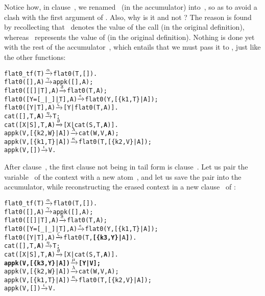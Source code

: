 Notice how, in clause~\clause{\lambda}, we renamed~ (in the
accumulator) into~, so as to avoid a clash with the first
argument of . Also, why is it  and
not ? The reason is found by recollecting that ~denotes the value of the call  (in the
original definition), whereas ~represents the value of
 (in the original definition). Nothing is done yet
with the rest of the accumulator~, which entails that we
must pass it to , just like the other functions:
\begin{alltt}
flat0\_tf(T)          \(\smashedrightarrow{\alpha}\) flat0(T,[]).
flat0(         [],A) \(\smashedrightarrow{\gamma}\) appk([],A);
flat0(     [[]|T],A) \(\smashedrightarrow{\delta}\) flat0(T,A);
flat0([Y=[\_|\_]|T],A) \(\smashedrightarrow{\epsilon}\) flat0(Y,[\{k1,T\}|A]);
flat0(      [Y|T],A) \(\smashedrightarrow{\zeta}\) [Y|flat0(T,A)].
cat(   [],T,\textbf{A})       \(\smashedrightarrow{\eta}\) T;\hfill% A \emph{unused yet}
cat([X|S],T,\textbf{A})       \(\smashedrightarrow{\theta}\) [X|cat(S,T,\textbf{A})].
appk(V,[\{k2,W\}|A])   \(\smashedrightarrow{\lambda}\) cat(W,V,\textbf{A});\hfill% \emph{Passed} A
appk(V,[\{k1,T\}|A])   \(\smashedrightarrow{\kappa}\) flat0(T,[\{k2,V\}|A]);
appk(V,        [])   \(\smashedrightarrow{\iota}\) V.
\end{alltt}
After clause~\clause{\epsilon}, the first clause not being in tail form is
clause~\clause{\zeta}. Let us pair the variable~ of the
context \erlcode{[Y|\textvisiblespace]} with a new atom~,
and let us save the pair into the accumulator, while reconstructing
the erased context in a new clause~\clause{\mu} of :
\begin{alltt}
flat0\_tf(T)          \(\smashedrightarrow{\alpha}\) flat0(T,[]).
flat0(         [],A) \(\smashedrightarrow{\gamma}\) appk([],A);
flat0(     [[]|T],A) \(\smashedrightarrow{\delta}\) flat0(T,A);
flat0([Y=[\_|\_]|T],A) \(\smashedrightarrow{\epsilon}\) flat0(Y,[\{k1,T\}|A]);
flat0(      [Y|T],A) \(\smashedrightarrow{\zeta}\) flat0(T,\textbf{[\{k3,Y\}|}A\textbf{]}).\hfill% Y \emph{saved}
cat(   [],T,\textbf{A})       \(\smashedrightarrow{\eta}\) T;\hfill% A \emph{unused yet}
cat([X|S],T,\textbf{A})       \(\smashedrightarrow{\theta}\) [X|cat(S,T,\textbf{A})].
\textbf{appk(V,[\{k3,Y\}|A])   \(\smashedrightarrow{\mu}\) [Y|V];}\hfill% A \emph{unused yet}
appk(V,[\{k2,W\}|A])   \(\smashedrightarrow{\lambda}\) cat(W,V,A);
appk(V,[\{k1,T\}|A])   \(\smashedrightarrow{\kappa}\) flat0(T,[\{k2,V\}|A]);
appk(V,        [])   \(\smashedrightarrow{\iota}\) V.
\end{alltt}
